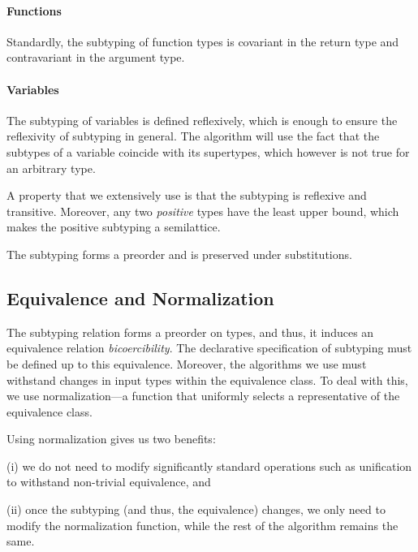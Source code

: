 \paragraph{Functions}
Standardly, the subtyping of function types is covariant in the return type
and contravariant in the argument type.

\paragraph{Variables}
The subtyping of variables is defined reflexively,
which is enough to ensure the reflexivity of subtyping in general.
The algorithm will use the fact that the subtypes of a variable 
coincide with its supertypes, which however is not true for an
arbitrary type.


A property that we extensively use is that the subtyping is reflexive and transitive. 
Moreover, any two \emph{positive} types have the least upper bound, which makes the positive subtyping a semilattice.

\begin{property}
  The subtyping forms a preorder and is preserved under substitutions. 
\end{property}


\subsection{Equivalence and Normalization}

The subtyping relation forms a preorder on types,
and thus, it induces an equivalence relation \aka \emph{bicoercibility}.
The declarative specification of subtyping must be defined up to this equivalence.
Moreover, the algorithms we use must withstand changes in input types within the equivalence class.
To deal with this, we use normalization---a function that uniformly selects a representative of the equivalence class.

Using normalization gives us two benefits:
\begin{enumerate*}
  \item [(i)] we do not need to modify significantly standard operations such as unification to withstand non-trivial equivalence, and
  \item [(ii)] once the subtyping (and thus, the equivalence) changes, we only need to modify the normalization function, 
    while the rest of the algorithm remains the same.
\end{enumerate*}


